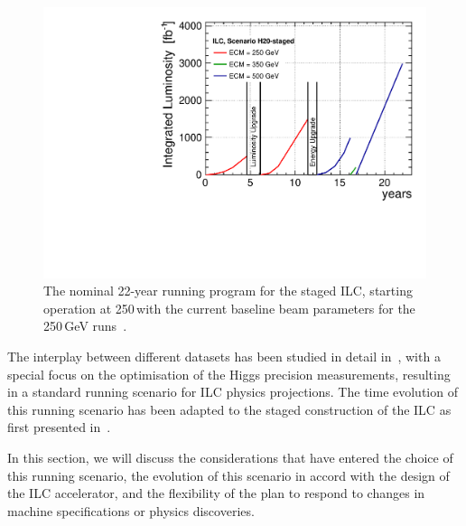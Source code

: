 \begin{figure}
\begin{center}
\includegraphics[width=0.90\hsize]{chapters/figures/lumi_H20-staged}
\end{center}
\caption{The nominal 22-year running program for the staged ILC, starting operation at 250\,\GeV with the current baseline beam parameters for the 250\,GeV runs~\cite{Fujii:2017vwa}. }
\label{fig:H20staged}
\end{figure}


The interplay between different datasets has been studied in detail in~\cite{Barklow:2015tja}, with a special focus on the optimisation of the Higgs precision measurements, resulting in a standard running scenario for ILC physics projections. The time evolution of this running scenario has been adapted to the staged construction of the ILC as first presented in~\cite{Fujii:2017vwa}. 

In this section, we will discuss the considerations that have entered the choice of this running scenario, the evolution of this scenario in accord with the design of the 
ILC accelerator, and the flexibility of the plan to respond to changes in machine
specifications or physics discoveries.

